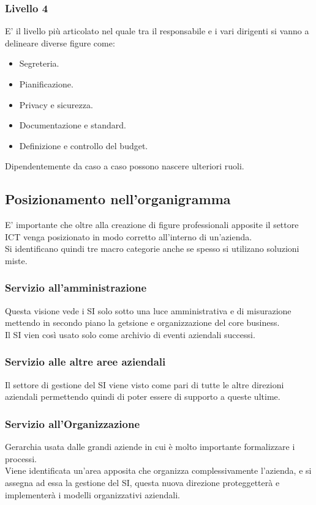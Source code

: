 \documentclass[../main.tex]{subfiles}
\begin{document}
	\subsubsection{Livello 4}
	E' il livello più articolato nel quale tra il responsabile e i vari dirigenti si vanno a delineare diverse figure come:
	\begin{itemize}
		\item Segreteria.
		\item Pianificazione.
		\item Privacy e sicurezza.
		\item Documentazione e standard.
		\item Definizione e controllo del budget.
	\end{itemize}
	Dipendentemente da caso a caso possono nascere ulteriori ruoli.

	\subsection{Posizionamento nell'organigramma}
	E' importante che oltre alla creazione di figure professionali apposite il settore ICT venga posizionato in modo corretto all'interno di un'azienda.\\
	Si identificano quindi tre macro categorie anche se spesso si utilizano soluzioni miste.
	
	\subsubsection{Servizio all'amministrazione}
	Questa visione vede i SI solo sotto una luce amministrativa e di misurazione mettendo in secondo piano la getsione e organizzazione del core business.\\
	Il SI vien così usato solo come archivio di eventi aziendali successi.

	\subsubsection{Servizio alle altre aree aziendali}
	Il settore di gestione del SI viene visto come pari di tutte le altre direzioni aziendali permettendo quindi di poter essere di supporto a queste ultime.

	\subsubsection{Servizio all'Organizzazione}
	Gerarchia usata dalle grandi aziende in cui è molto importante formalizzare i processi.\\
	Viene identificata un'area apposita che organizza complessivamente l'azienda, e si assegna ad essa la gestione del SI, questa nuova direzione proteggetterà e implementerà i modelli organizzativi aziendali.
\end{document}
